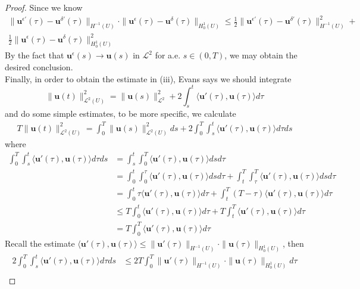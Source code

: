 \documentclass{article}
\begin{document}
\begin{proof}
    Since we know 
    \begin{align*}
        \|\textbf{u}^{\epsilon'}(\tau)-\textbf{u}^{\delta'}(\tau)\|_{H^{-1}(U)}
        \cdot \|\textbf{u}^\epsilon(\tau)-\textbf{u}^\delta(\tau)\|_{H_0^1(U)}\leq \frac{1}{2}\|\textbf{u}^{\epsilon'}(\tau)-\textbf{u}^{\delta'}(\tau)\|_{H^{-1}(U)}^2+ \\
        \frac{1}{2}\|\textbf{u}^\epsilon(\tau)-\textbf{u}^\delta(\tau)\|_{H_0^1(U)}^2
    \end{align*}
    By the fact that $\textbf{u}^\epsilon(s)\to\textbf{u}(s)$ in $\mathscr{L}^2$ for a.e. $s\in(0,T)$, we may obtain the desired conclusion. \\
    \indent Finally, in order to obtain the estimate in (iii), Evans says we should integrate 
    $$
    \|\textbf{u}(t)\|_{\mathscr{L}^2(U)}^2=\|\textbf{u}(s)\|_{\mathscr{L}^2}^2+2\int_s^t\langle\textbf{u}'(\tau), \textbf{u}(\tau)\rangle d\tau 
    $$ and do some simple estimates, to be more specific, we calculate
    \begin{align*}
        T\|\textbf{u}(t)\|_{\mathscr{L}^2(U)}^2=\int_0^T\|\textbf{u}(s)\|_{\mathscr{L}^2(U)}^2ds+2\int_0^T\int_s^t\langle\textbf{u}'(\tau), \textbf{u}(\tau)\rangle d\tau ds
    \end{align*}
    where 
    \begin{align*}
        \int_0^T\int_s^t \langle\textbf{u}'(\tau), \textbf{u}(\tau)\rangle d\tau ds&=\int_s^t\int_0^T \langle\textbf{u}'(\tau), \textbf{u}(\tau)\rangle dsd\tau \\
        &= \int_0^t\int_0^\tau\langle\textbf{u}'(\tau), \textbf{u}(\tau)\rangle dsd\tau + \int_t^T\int_\tau^T \langle\textbf{u}'(\tau), \textbf{u}(\tau)\rangle dsd\tau \\
        &=\int_0^t \tau \langle\textbf{u}'(\tau), \textbf{u}(\tau)\rangle d\tau +\int_t^T (T-\tau) \langle\textbf{u}'(\tau), \textbf{u}(\tau)\rangle d\tau \\
        &\leq T\int_0^t \langle\textbf{u}'(\tau), \textbf{u}(\tau)\rangle d\tau + T\int_t^T \langle\textbf{u}'(\tau), \textbf{u}(\tau)\rangle d\tau \\
        &= T\int_0^T \langle\textbf{u}'(\tau), \textbf{u}(\tau)\rangle d\tau
    \end{align*}
    Recall the estimate $\langle\textbf{u}'(\tau), \textbf{u}(\tau)\rangle\leq \|\textbf{u}'(\tau)\|_{H^{-1}(U)}\cdot\|\textbf{u}(\tau)\|_{H_0^1(U)}$, then
    \begin{align*}
        2\int_0^T\int_s^t \langle\textbf{u}'(\tau), \textbf{u}(\tau)\rangle d\tau ds&\leq 2T\int_0^T \|\textbf{u}'(\tau)\|_{H^{-1}(U)}\cdot\|\textbf{u}(\tau)\|_{H_0^1(U)} d\tau \\

\end{align*}
\end{proof}
\end{document}
